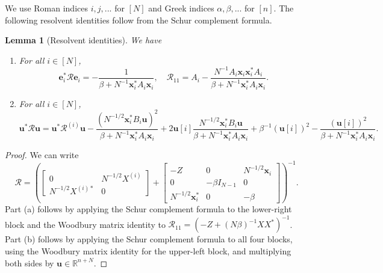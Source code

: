 \documentclass[11pt,reqno]{amsart}
\def\R{\mathbb{R}}
\def\e{\mathbf{e}}
\def\u{\mathbf{u}}
\def\x{\mathbf{x}}
\def\cR{\mathcal{R}}
\newtheorem{lemma}[theorem]{Lemma}
\theoremstyle{definition}
\numberwithin{equation}{section}
\numberwithin{figure}{section}
\begin{document}
We use Roman indices $i,j,...$ for $[N]$ and Greek indices $\alpha,\beta,...$ for $[n]$. The following resolvent identities follow from the Schur complement formula.
\begin{lemma}[Resolvent identities]\label{lem:schur-one-column}
We have
\begin{enumerate}[label=(\alph*)]
    \item For all $i\in[N]$,
    \[
        \e_i^*\cR\e_i=-\frac{1}{\beta+N^{-1}\x_i^*A_{i}\x_i},\quad 
        \cR_{11}=A_i-\frac{N^{-1}A_i\x_i\x_i^*A_i}{\beta+N^{-1}\x_i^*A_i\x_i}.
    \]
    \item For all $i\in[N]$,
    \begin{equation}\label{eq:minor-identity}
    \u^*\cR\u=\u^*\cR^{(i)}\u-\frac{(N^{-1/2}\x_i^*B_i\u)^2}{\beta+N^{-1}\x_i^*A_i\x_i}+2\u[i]\frac{N^{-1/2}\x_i^*B_i\u}{\beta+N^{-1}\x_i^*A_i\x_i}+\beta^{-1}(\u[i])^2-\frac{(\u[i])^2}{\beta+N^{-1}\x_i^*A_i\x_i} . 
    \end{equation}
\end{enumerate}
\end{lemma}
\begin{proof}
We can write
\[
    \cR=\left(\begin{bmatrix}
    0 & N^{-1/2}X^{(i)}\\
    N^{-1/2}X^{(i)*} & 0
    \end{bmatrix}+
    \left[
    \begin{array}{cc|c}
    -Z & 0 & N^{-1/2}\x_{i} \\
    0 & -\beta I_{N-1} & 0 \\
    \hline
    N^{-1/2}\x_{i}^* & 0 & -\beta
    \end{array}
    \right]
    \right)^{-1}.
\]
Part (a) follows by applying the Schur complement formula to the lower-right block and the Woodbury matrix identity to $\cR_{11}=(-Z+(N\beta)^{-1}XX^*)^{-1}$. Part (b) follows by applying the Schur complement formula to all four blocks, using the Woodbury matrix identity for the upper-left block, and multiplying both sides by $\u\in\R^{n+N}$.
\end{proof}
\end{document}
